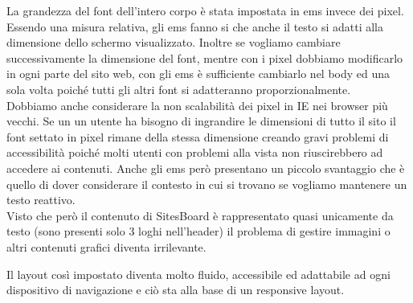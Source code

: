 \documentclass[12pt]{article}
\begin{document}
	La grandezza del font dell'intero corpo è stata impostata in ems invece dei pixel.
	Essendo una misura relativa, gli ems fanno si che anche il testo si adatti alla dimensione dello schermo visualizzato. Inoltre se vogliamo cambiare successivamente la dimensione del font, mentre con i pixel dobbiamo modificarlo in ogni parte del sito web, con gli ems è sufficiente cambiarlo nel body ed una sola volta poiché tutti gli altri font si adatteranno proporzionalmente.\\
	Dobbiamo anche considerare la non scalabilità dei pixel in IE nei browser più vecchi. Se un un utente ha bisogno di ingrandire le dimensioni di tutto il sito il font settato in pixel rimane della stessa dimensione creando gravi problemi di accessibilità poiché molti utenti con problemi alla vista non riuscirebbero ad accedere ai contenuti.
	Anche gli ems però presentano un piccolo svantaggio che è quello di dover considerare il contesto in cui si trovano se vogliamo mantenere un testo reattivo.\\ Visto che però il contenuto di SitesBoard è rappresentato quasi unicamente da testo (sono presenti solo 3 loghi nell'header) il problema di gestire immagini o altri contenuti grafici diventa irrilevante.
	
	Il layout così impostato diventa molto fluido, accessibile ed adattabile ad ogni dispositivo di navigazione e ciò sta alla base di un responsive layout.
	
	\newpage
	
\end{document}
